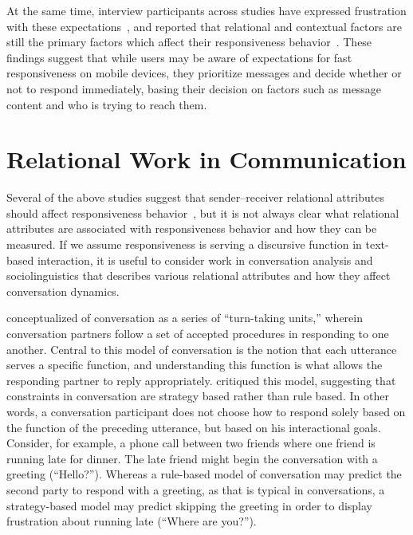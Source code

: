 \documentclass[12pt]{nuthesis}	%
\begin{document}
At the same time, interview participants across studies have expressed frustration with these expectations~\citep{ames2013managing}, and reported that relational and contextual factors are still the primary factors which affect their responsiveness behavior~\citep{grandhi2010technology,wohn2015ambient}. These findings suggest that while users may be aware of expectations for fast responsiveness on mobile devices, they prioritize messages and decide whether or not to respond immediately, basing their decision on factors such as message content and who is trying to reach them.

\section{Relational Work in Communication}

Several of the above studies suggest that sender--receiver relational attributes should affect responsiveness behavior~\citep[e.g.,][]{grandhi2010technology,kalman2006pauses,walther1995nonverbal,wohn2015ambient}, but it is not always clear what relational attributes are associated with responsiveness behavior and how they can be measured. If we assume responsiveness is serving a discursive function in text-based interaction, it is useful to consider work in conversation analysis and sociolinguistics that describes various relational attributes and how they affect conversation dynamics.

\citet{sacks1974simplest} conceptualized of conversation as a series of ``turn-taking units,'' wherein conversation partners follow a set of accepted procedures in responding to one another. Central to this model of conversation is the notion that each utterance serves a specific function, and understanding this function is what allows the responding partner to reply appropriately. \citet{levinson1981essential} critiqued this model, suggesting that constraints in conversation are strategy based rather than rule based. In other words, a conversation participant does not choose how to respond solely based on the function of the preceding utterance, but based on his interactional goals. Consider, for example, a phone call between two friends where one friend is running late for dinner. The late friend might begin the conversation with a greeting (``Hello?''). Whereas a rule-based model of conversation may predict the second party to respond with a greeting, as that is typical in conversations, a strategy-based model may predict skipping the greeting in order to display frustration about running late (``Where are you?'').
\end{document}
